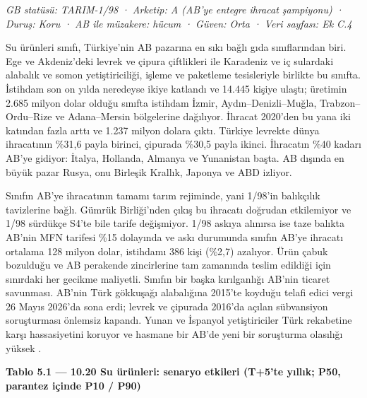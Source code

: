 \emph{GB statüsü: TARIM-1/98 · Arketip: A (AB'ye entegre ihracat şampiyonu) · Duruş: Koru · AB ile müzakere: hücum · Güven: Orta · Veri sayfası: Ek C.4}

Su ürünleri sınıfı, Türkiye'nin AB pazarına en sıkı bağlı gıda sınıflarından biri. Ege ve Akdeniz'deki levrek ve çipura çiftlikleri ile Karadeniz ve iç sulardaki alabalık ve somon yetiştiriciliği, işleme ve paketleme tesisleriyle birlikte bu sınıfta. İstihdam son on yılda neredeyse ikiye katlandı ve 14.445 kişiye ulaştı; üretimin 2.685 milyon dolar olduğu sınıfta istihdam İzmir, Aydın--Denizli--Muğla, Trabzon--Ordu--Rize ve Adana--Mersin bölgelerine dağılıyor. İhracat 2020'den bu yana iki katından fazla arttı ve 1.237 milyon dolara çıktı. Türkiye levrekte dünya ihracatının \%31,6 payla birinci, çipurada \%30,5 payla ikinci. İhracatın \%40 kadarı AB'ye gidiyor: İtalya, Hollanda, Almanya ve Yunanistan başta. AB dışında en büyük pazar Rusya, onu Birleşik Krallık, Japonya ve ABD izliyor.

Sınıfın AB'ye ihracatının tamamı tarım rejiminde, yani 1/98'in balıkçılık tavizlerine bağlı. Gümrük Birliği'nden çıkış bu ihracatı doğrudan etkilemiyor ve 1/98 sürdükçe S4'te bile tarife değişmiyor. 1/98 askıya alınırsa ise taze balıkta AB'nin MFN tarifesi \%15 dolayında ve askı durumunda sınıfın AB'ye ihracatı ortalama 128 milyon dolar, istihdamı 386 kişi (\%2,7) azalıyor. Ürün çabuk bozulduğu ve AB perakende zincirlerine tam zamanında teslim edildiği için sınırdaki her gecikme maliyetli. Sınıfın bir başka kırılganlığı AB'nin ticaret savunması. AB'nin Türk gökkuşağı alabalığına 2015'te koyduğu telafi edici vergi 26 Mayıs 2026'da sona erdi; levrek ve çipurada 2016'da açılan sübvansiyon soruşturması önlemsiz kapandı. Yunan ve İspanyol yetiştiriciler Türk rekabetine karşı hassasiyetini koruyor ve hasmane bir AB'de yeni bir soruşturma olasılığı yüksek \etiketH{}.


\textbf{Tablo 5.1 --- 10.20 Su ürünleri: senaryo etkileri (T+5'te yıllık; P50, parantez içinde P10 / P90)}

\nopagebreak[4]

\begingroup\gbtablo\footnotesize


